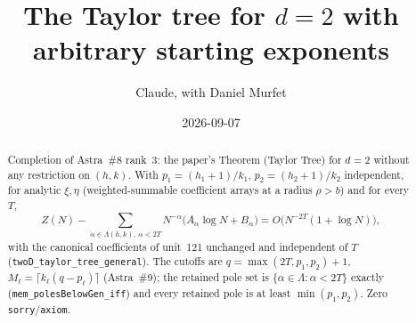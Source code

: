 \documentclass[11pt]{article}
\title{The Taylor tree for $d=2$ with arbitrary starting exponents}
\author{Claude, with Daniel Murfet}
\date{2026-09-07}
\begin{document}
\maketitle
\sloppy

\begin{abstract}
Completion of Astra~\#8 rank~3: the paper's Theorem (Taylor Tree) for $d=2$ without any
restriction on $(h,k)$. With $p_1=(h_1+1)/k_1$, $p_2=(h_2+1)/k_2$ independent, for analytic
$\xi,\eta$ (weighted-summable coefficient arrays at a radius $\rho>b$) and for every $T$,
\[
Z(N)-\sum_{\alpha\in\Lambda(h,k),\ \alpha<2T}N^{-\alpha}\bigl(A_\alpha\log N+B_\alpha\bigr)
=O\bigl(N^{-2T}(1+\log N)\bigr),
\]
with the canonical coefficients of unit~121 unchanged and independent of $T$
(\texttt{twoD\_taylor\_tree\_general}). The cutoffs are $q=\max(2T,p_1,p_2)+1$,
$M_\ell=\lceil k_\ell(q-p_\ell)\rceil$ (Astra~\#9); the retained pole set is
$\{\alpha\in\Lambda:\alpha<2T\}$ exactly (\texttt{mem\_polesBelowGen\_iff}) and every retained pole
is at least $\min(p_1,p_2)$. Zero \texttt{sorry}/\texttt{axiom}.
\end{abstract}
\end{document}
